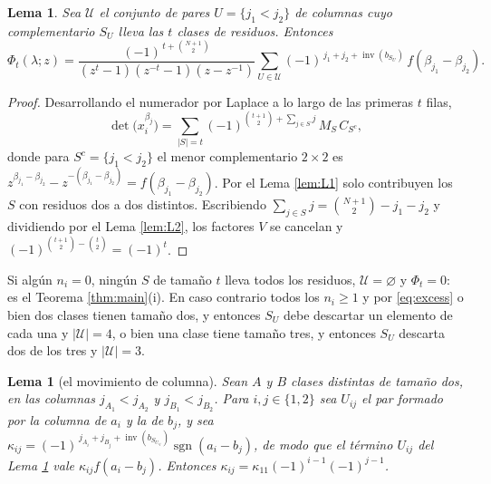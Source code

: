 \documentclass[11pt,reqno]{amsart}
\theoremstyle{plain}
\newtheorem{lemma}[theorem]{Lema}
\theoremstyle{definition}
\newcommand{\inv}{\operatorname{inv}}
\newcommand{\sgn}{\operatorname{sgn}}
\begin{document}
\begin{lemma}\label{lem:L3}
Sea $\mathcal U$ el conjunto de pares $U=\{j_1<j_2\}$ de columnas cuyo complementario $S_U$ lleva las
$t$ clases de residuos. Entonces
\[
\Phi_t(\lambda;z)=\frac{(-1)^{\,t+\binom{N+1}{2}}}{(z^t-1)(z^{-t}-1)(z-z^{-1})}
\sum_{U\in\mathcal U}(-1)^{\,j_1+j_2+\inv(b_{S_U})}\,f(\beta_{j_1}-\beta_{j_2}).
\]
\end{lemma}

\begin{proof}
Desarrollando el numerador por Laplace a lo largo de las primeras $t$ filas,
\[
\det\bigl(x_i^{\beta_j}\bigr)=\sum_{|S|=t}(-1)^{\binom{t+1}{2}+\sum_{j\in S}j}\,M_S\,C_{S^c},
\]
donde para $S^c=\{j_1<j_2\}$ el menor complementario $2\times2$ es
$z^{\beta_{j_1}-\beta_{j_2}}-z^{-(\beta_{j_1}-\beta_{j_2})}=f(\beta_{j_1}-\beta_{j_2})$. Por el Lema
\ref{lem:L1} solo contribuyen los $S$ con residuos dos a dos distintos. Escribiendo
$\sum_{j\in S}j=\binom{N+1}{2}-j_1-j_2$ y dividiendo por el Lema \ref{lem:L2}, los factores $V$ se
cancelan y $(-1)^{\binom{t+1}{2}-\binom{t}{2}}=(-1)^t$.
\end{proof}

Si algún $n_i=0$, ningún $S$ de tamaño $t$ lleva todos los residuos, $\mathcal U=\varnothing$ y
$\Phi_t=0$: es el Teorema \ref{thm:main}(i). En caso contrario todos los $n_i\ge1$ y por
\eqref{eq:excess} o bien dos clases tienen tamaño dos, y entonces $S_U$ debe descartar un elemento de
cada una y $|\mathcal U|=4$, o bien una clase tiene tamaño tres, y entonces $S_U$ descarta dos de los
tres y $|\mathcal U|=3$.

\begin{lemma}[el movimiento de columna]\label{lem:L4}
Sean $A$ y $B$ clases distintas de tamaño dos, en las columnas $j_{A_1}<j_{A_2}$ y
$j_{B_1}<j_{B_2}$. Para $i,j\in\{1,2\}$ sea $U_{ij}$ el par formado por la columna de $a_i$ y la de
$b_j$, y sea $\kappa_{ij}=(-1)^{\,j_{A_i}+j_{B_j}+\inv(b_{S_{U_{ij}}})}\sgn(a_i-b_j)$, de modo que
el término $U_{ij}$ del Lema \ref{lem:L3} vale $\kappa_{ij}f(a_i-b_j)$. Entonces
$\kappa_{ij}=\kappa_{11}(-1)^{i-1}(-1)^{j-1}$.
\end{lemma}
\end{document}
